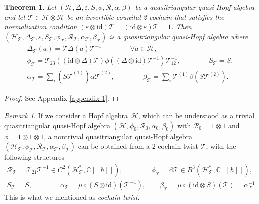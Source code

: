 \documentclass[reqno]{amsart}
\newtheorem{theorem}[formula]{Theorem}
\theoremstyle{definition}
\theoremstyle{remark}
\newtheorem{remark}[formula]{Remark}
\begin{document}
\begin{theorem}\label{theorem:twist of quasitri quasi-Hopf}
    Let $(\mathscr{H},\Delta,\varepsilon,S,\phi,\mathcal{R},\alpha,\beta)$ be a quasitriangular quasi-Hopf algebra and let $\mathcal{T}\in \mathscr{H}\otimes \mathscr{H}$ be an invertible counital 2-cochain that satisfies the normalization condition $(\varepsilon \otimes \textrm{id})\mathcal{T}=( \textrm{id}\otimes \varepsilon)\mathcal{T}=1$. Then $(\mathscr{H}_\mathcal{T},\Delta_\mathcal{T},\varepsilon,S_\mathcal{T},\phi_\mathcal{T},\mathcal{R}_\mathcal{T},\alpha_\mathcal{T},\beta_\mathcal{T})$ is a quasitriangular quasi-Hopf algebra where
    \begin{equation}
        \begin{split}
            \Delta_\mathcal{T}(a)=\mathcal{T} \Delta(a)\mathcal{T}^{-1} \qquad \qquad \forall a \in \mathscr{H}, \\
            \phi_\mathcal{T} = \mathcal{T}_{23}\left((\textrm{id}\otimes\Delta) \mathcal{T}\right)\phi \left((\Delta \otimes \textrm{id})\mathcal{T}^{-1}\right)\mathcal{T}_{12}^{-1}, \qquad \qquad S_\mathcal{T}=S, \\
            \alpha_\mathcal{T}= \sum\limits_i \left(S\bar{\mathcal{T}}^{(1)}\right)\alpha \bar{\mathcal{T}}^{(2)}, \qquad \qquad\beta_\mathcal{T}= \sum\limits_i \mathcal{T}^{(1)}\beta \left(S {\mathcal{T}}^{(2)}\right).
        \end{split}
    \end{equation}
\end{theorem}
\begin{proof}
    See Appendix \ref{appendix 1}.
\end{proof}

\begin{remark}\label{rmk:quasitri quasi-Hopf alg from twist}
    If we consider a Hopf algebra $\mathscr{H}$, which can be understood as a trivial quasitriangular quasi-Hopf algebra $\left(\mathscr{H},\phi_0,\mathcal{R}_0,\alpha_0,\beta_0\right)$ with $\mathcal{R}_0=1\otimes 1$ and $\phi = 1\otimes 1 \otimes 1$, a nontrivial quasitriangular quasi-Hopf algebra $\left(\mathscr{H}_\mathcal{T},\phi_\mathcal{T},\mathcal{R}_\mathcal{T},\alpha_\mathcal{T},\beta_\mathcal{T}\right)$ can be obtained from a 2-cochain twist $\mathcal{T}$, with the following structures
\begin{equation}
   \begin{split}
        \mathcal{R}_\mathcal{T} = \mathcal{T}_{21}\mathcal{T}^{-1} \in C^2\left(\mathscr{H}^*_\mathcal{T},\mathbb{C}[[\hbar]]\right), \qquad \qquad \phi_\mathcal{T} = \text{d}\mathcal{T} \in B^3 \left(\mathscr{H}^*_\mathcal{T},\mathbb{C}[[\hbar]]\right),\\
        S_\mathcal{T} = S, \qquad\qquad \alpha_\mathcal{T} = \mu \circ (S\otimes \text{id})(\mathcal{T}^{-1}), \qquad \beta_\mathcal{T} = \mu \circ (\text{id} \otimes S)(\mathcal{T}) = \alpha_\mathcal{T}^{-1} 
   \end{split}
\end{equation}
This is what we mentioned as \textit{cochain twist}. 
\end{remark}
\end{document}

